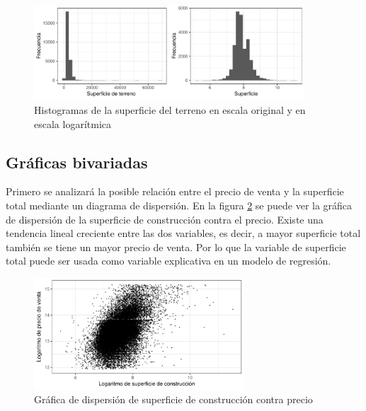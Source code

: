 \begin{figure}[H]
    \centering
    \includegraphics[width=0.9\textwidth]{images/eda_histograma_superficie_total_land.pdf}
    \caption{Histogramas de la superficie del terreno en escala original y en escala logarítmica}
    \label{fig:eda_histograma_superficie_total_land}
\end{figure}






\subsection{Gráficas bivariadas}

Primero se analizará la posible relación entre el precio de venta y la superficie total mediante un diagrama de dispersión. En la figura \ref{fig:eda_dispersion_superficie_vs_precio} se puede ver la gráfica de dispersión de la superficie de construcción contra el precio. Existe una tendencia lineal creciente entre las dos variables, es decir, a mayor superficie total también se tiene un mayor precio de venta. Por lo que la variable de superficie total puede ser usada como variable explicativa en un modelo de regresión.

\begin{figure}[H]
    \centering
    \includegraphics[width=0.7\textwidth]{images/eda_dispersion_superficie_vs_precio.pdf}
    \caption{Gráfica de dispersión de superficie de construcción contra precio}
    \label{fig:eda_dispersion_superficie_vs_precio}
\end{figure}


